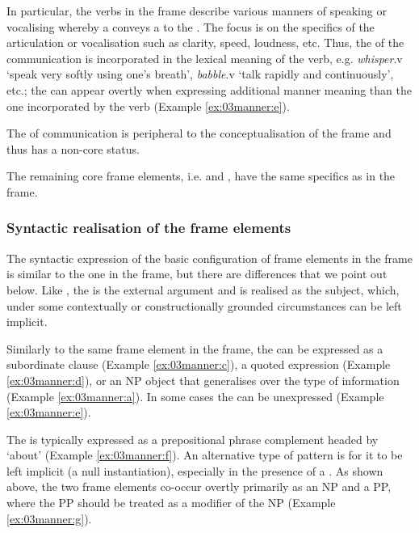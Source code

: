 \documentclass[output=paper,colorlinks,citecolor=brown]{langscibook}
\begin{document}
In particular, the verbs in the  frame describe various manners of speaking or vocalising whereby a  conveys a  to the . The focus is on the specifics of the articulation or vocalisation such as clarity, speed, loudness, etc. Thus, the  of the communication is incorporated in the lexical meaning of the verb, e.g. \textit{whisper}.v `speak very softly using one's breath', \textit{babble}.v `talk rapidly and continuously', etc.; the  can appear overtly when expressing additional manner meaning than the one incorporated by the verb (Example \ref{ex:03manner:e}). 

The  of communication is peripheral to the conceptualisation of the frame and thus has a non-core status. 

The remaining core frame elements, i.e.  and , have the same specifics as in the  frame.

\subsubsection{Syntactic realisation of the  frame elements}
\largerpage

The syntactic expression of the basic configuration of frame elements in the  frame is similar to the one in the  frame, but there are differences that we point out below. Like , the  is the external argument and is realised as the subject, which, under some contextually or constructionally grounded circumstances can be left implicit. 

Similarly to the same frame element in the  frame, the  can be expressed as a subordinate clause (Example \ref{ex:03manner:c}), a quoted expression (Example \ref{ex:03manner:d}), or an NP object  that generalises over the type of information (Example \ref{ex:03manner:a}). In some cases the  can be unexpressed (Example \ref{ex:03manner:e}).

The  is typically expressed as a prepositional phrase complement headed by `about’ (Example \ref{ex:03manner:f}).
An alternative type of pattern is for it to be left implicit (a null instantiation), especially in the presence of a . As shown above, the two frame elements co-occur overtly primarily as an NP and a PP, where the  PP should be treated as a modifier of the  NP (Example \ref{ex:03manner:g}).
\end{document}
